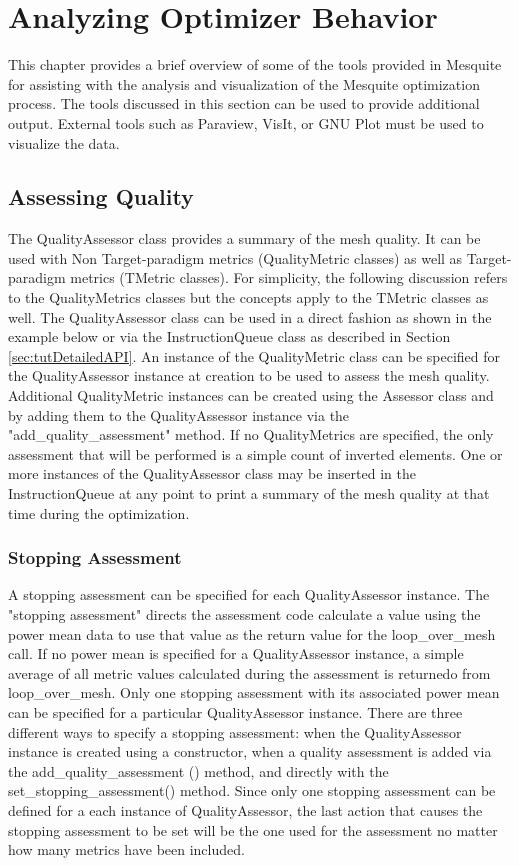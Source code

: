 \chapter{Analyzing Optimizer Behavior}

This chapter provides a brief overview of some of the tools provided in Mesquite for assisting with the analysis and visualization of the Mesquite optimization process.  The tools discussed in this section can be used to provide additional output.	 External tools such as Paraview, VisIt, or GNU Plot must be used to visualize the data.

\section{Assessing Quality}

  The QualityAssessor class provides a summary of the mesh quality. It can be used with Non Target-paradigm metrics (QualityMetric classes) as well as Target-paradigm metrics (TMetric classes). For simplicity, the following discussion refers to the QualityMetrics classes but the concepts apply to the TMetric classes as well.	The QualityAssessor class can be used in a direct fashion as shown in the example below or via the InstructionQueue class as described in Section \ref{sec:tutDetailedAPI}.  An instance of the QualityMetric class can be specified for the QualityAssessor instance at creation to be used to assess the mesh quality.  Additional QualityMetric instances can be created using the Assessor class and by adding them to the QualityAssessor instance via the "add\_quality\_assessment" method. If no QualityMetrics are specified, the only assessment that will be performed is a simple count of inverted elements. One or more instances of the QualityAssessor class may be inserted in the InstructionQueue at any point to print a summary of the mesh quality at that time during the optimization.

\subsection{Stopping Assessment}

A stopping assessment can be specified for each QualityAssessor instance.  The "stopping assessment" directs the assessment code calculate a value using the power mean data to use that value as the return value for the loop\_over\_mesh call.  If no power mean is specified for a QualityAssessor instance, a simple average of all metric values calculated during the assessment is returnedo from  loop\_over\_mesh.  Only one stopping assessment with its associated power mean can be specified for a particular QualityAssessor instance.  There are three different ways to specify a stopping assessment: when the QualityAssessor instance is created using a constructor, when a quality assessment is added via the add\_quality\_assessment () method, and directly with the set\_stopping\_assessment() method.  Since only one stopping assessment can be defined for a each instance of QualityAssessor, the last action that causes the stopping assessment to be set will be the one used for the assessment no matter how many metrics have been included.

